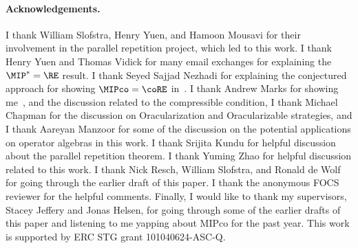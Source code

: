 \paragraph{Acknowledgements.}  I thank William Slofstra, Henry Yuen, and Hamoon Mousavi for their involvement in the parallel repetition project, which led to this work. I thank Henry Yuen and Thomas Vidick for many email exchanges for explaining the $\MIP^*=\RE$ result. I thank Seyed Sajjad Nezhadi for explaining the conjectured approach for showing $\MIPco=\coRE$ in~\cite{mousaviNonlocalGamesCompression2022}. I thank Andrew Marks for showing me~, and the discussion related to the compressible condition,  I thank Michael Chapman for the discussion on Oracularization and Oracularizable strategies, and I thank Aareyan Manzoor for some of the discussion on the potential applications on operator algebras in this work. I thank Srijita Kundu for helpful discussion about the parallel repetition theorem. I thank Yuming Zhao for helpful discussion related to this work. I thank Nick Resch, William Slofstra, and Ronald de Wolf for going through the earlier draft of this paper. I thank the anonymous FOCS reviewer for the helpful comments. Finally, I would like to thank my supervisors, Stacey Jeffery and Jonas Helsen, for going through some of the earlier drafts of this paper and listening to me yapping about MIPco for the past year. This work is supported by ERC STG grant 101040624-ASC-Q. 

 
